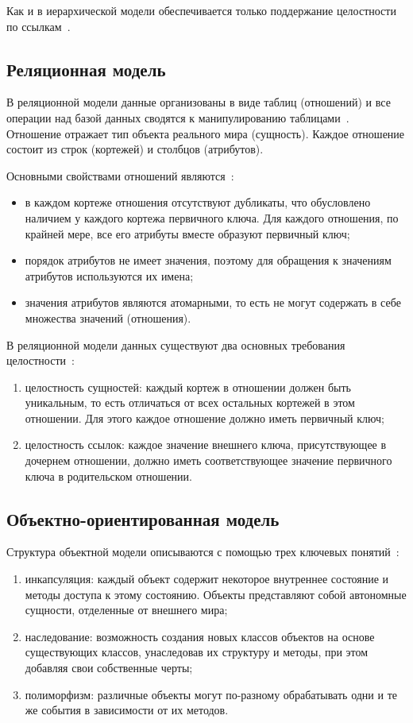 Как и в иерархической модели обеспечивается только поддержание целостности по ссылкам~\cite{network}.

\subsection{Реляционная модель}

В реляционной модели данные организованы в виде таблиц (отношений) и все операции над базой данных сводятся к манипулированию таблицами~\cite{db-models}. 
Отношение отражает тип объекта реального мира (сущность).
Каждое отношение состоит из строк (кортежей) и столбцов (атрибутов).

Основными свойствами отношений являются~\cite{rel-properties}:
\begin{itemize}[label=---]
    \item в каждом кортеже отношения отсутствуют дубликаты, что обусловлено наличием у каждого кортежа первичного ключа. Для каждого отношения, по крайней мере, все его атрибуты вместе образуют первичный ключ;
    \item порядок атрибутов не имеет значения, поэтому для обращения к значениям атрибутов используются их имена;
    \item значения атрибутов являются атомарными, то есть не могут содержать в себе множества значений (отношения).
\end{itemize}

В реляционной модели данных существуют два основных требования целостности~\cite{rel-restricts}:
\begin{enumerate}
    \item целостность сущностей: каждый кортеж в отношении должен быть уникальным, то есть отличаться от всех остальных кортежей в этом отношении. Для этого каждое отношение должно иметь первичный ключ;
    \item целостность ссылок: каждое значение внешнего ключа, присутствующее в дочернем отношении, должно иметь соответствующее значение первичного ключа в родительском отношении.
\end{enumerate}

\subsection{Объектно-ориентированная модель}

Структура объектной модели описываются с помощью трех ключевых понятий~\cite{OOM}:
\begin{enumerate}
    \item инкапсуляция: каждый объект содержит некоторое внутреннее состояние и методы доступа к этому состоянию. Объекты представляют собой автономные сущности, отделенные от внешнего мира;
    \item наследование: возможность создания новых классов объектов на основе существующих классов, унаследовав их структуру и методы, при этом добавляя свои собственные черты;
    \item полиморфизм: различные объекты могут по-разному обрабатывать одни и те же события в зависимости от их методов.
\end{enumerate}

